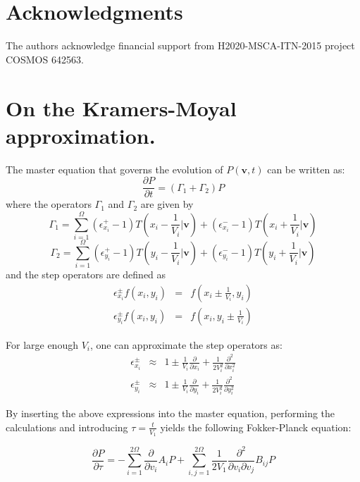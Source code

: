 \documentclass[showpacs,prl,superscriptaddress,nofootinbib, twocolumn]{revtex4}
\begin{document}
\section*{Acknowledgments}
The authors acknowledge financial support from H2020-MSCA-ITN-2015 project COSMOS  642563. 


\appendix



\section{On the Kramers-Moyal approximation.}

The master equation that governs the evolution of $P({\boldsymbol v},t)$ can be written as:
\[
\frac{\partial P}{\partial t}=(\Gamma_1+\Gamma_2)P
\]
where the operators $\Gamma_1$ and $\Gamma_2$ are given by
\[
\Gamma_1=\sum_{i=1}^{\Omega} (\epsilon_{{x_i}}^{+}-1)T({x_i}-\frac{1}{V_i}|{\boldsymbol v})+(\epsilon_{{x_i}}^{-}-1)T({x_i}+\frac{1}{V_i}|{\boldsymbol v})
\]
\[
\Gamma_2=\sum_{i=1}^{\Omega} (\epsilon_{{y_i}}^{+}-1)T({y_i}-\frac{1}{V_i}|{\boldsymbol v})+(\epsilon_{{y_i}}^{-}-1)T({y_i}+\frac{1}{V_i}|{\boldsymbol v})
\]
and the step operators are defined as 
\begin{eqnarray*}
\epsilon_{x_i}^\pm f({x_i},{y_i}) &=& f({x_i} \pm \frac{1}{V_i},{y_i}) \\
\epsilon_{y_i}^\pm f({x_i},{y_i}) &=& f({x_i},y_i \pm \frac{1}{V_i}) 
\end{eqnarray*}


For large enough $V_i$, one can approximate the step operators as:
 \begin{eqnarray*}
\epsilon_{{x_i}}^\pm &\approx& 1 \pm \frac{1}{V_i}\frac{\partial}{\partial {x}_i}+\frac{1}{2V_i^2} \frac{\partial^2}{\partial {x}_i^2} \\
\epsilon_{{y_i}}^\pm &\approx& 1 \pm \frac{1}{V_i}\frac{\partial}{\partial {y}_i}+\frac{1}{2V_i^2} \frac{\partial^2}{\partial {y}_i^2}
\end{eqnarray*}

By inserting the above expressions into the master equation, performing the calculations and introducing $\tau=\frac{t}{V_1}$ yields the following Fokker-Planck equation:

\begin{equation}
\label{FP}
\frac{\partial P}{\partial \tau}= -\sum_{i=1}^{2\Omega} \frac{\partial}{\partial {v}_i} A_i P +\sum_{i,j=1}^{2\Omega}\frac{1}{2V_1}\frac{\partial^2}{\partial {v}_i\partial {v}_j} B_{ij}P
\end{equation}
\end{document}
